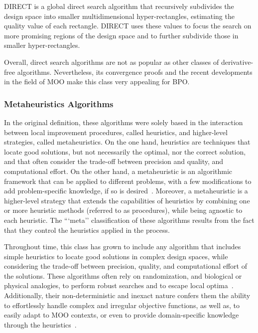 	DIRECT is a global direct search algorithm that recursively subdivides the design space into smaller multidimensional hyper-rectangles, estimating the quality value of each rectangle. DIRECT uses these values to focus the search on more promising regions of the design space and to further subdivide those in smaller hyper-rectangles. 
	
	Overall, direct search algorithms are not as popular as other classes of derivative-free algorithms. Nevertheless, its convergence proofs and the recent developments in the field of \ac{MOO} make this class very appealing for \ac{BPO}. 
	
	\subsubsection{Metaheuristics Algorithms}
	\label{ssec:metaheuristics}
	
	In the original definition, these algorithms were solely based in the interaction between local improvement procedures, called heuristics, and higher-level strategies, called metaheuristics. On the one hand, heuristics are techniques that locate good solutions, but not necessarily the optimal, nor the correct solution, and that often consider the trade-off between precision and quality, and computational effort. On the other hand, a metaheuristic is an algorithmic framework that can be applied to different problems, with a few modifications to add problem-specific knowledge, if so is desired~\cite{Glover2003Metaheuristics}. Moreover, a metaheuristic is a higher-level strategy that extends the capabilities of heuristics by combining one or more heuristic methods (referred to as procedures), while being agnostic to each heuristic. The ```meta'' classification of these algorithms results from the fact that they control the heuristics applied in the process.
	
	Throughout time, this class has grown to include any algorithm that includes simple heuristics to locate good solutions in complex design spaces, while considering the trade-off between precision, quality, and computational effort of the solutions. These algorithms often rely on randomization, and biological or physical analogies, to perform robust searches and to escape local optima~\cite{Glover2003Metaheuristics}. Additionally, their non-deterministic and inexact nature confers them the ability to effortlessly handle complex and irregular objective functions, as well as, to easily adapt to \ac{MOO} contexts, or even to provide domain-specific knowledge through the heuristics~\cite{Wortmann2017GABESTCHOICE}.
	
